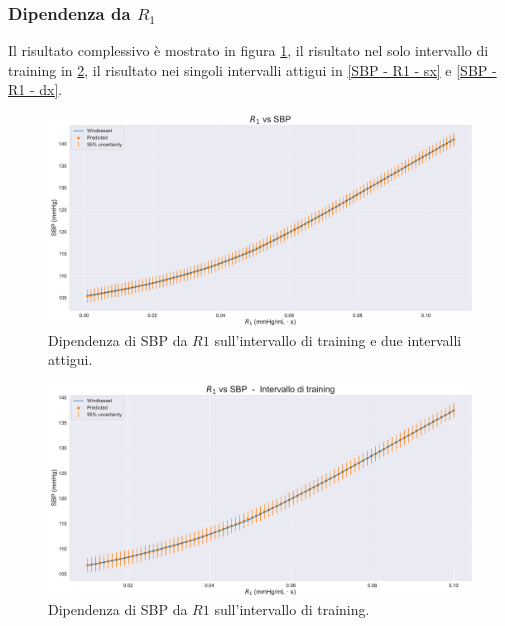 \newpage

\subsubsection{Dipendenza da $R_1$}
Il risultato complessivo è mostrato in figura \ref{SBP - R1 - full}, il risultato nel solo intervallo di training in \ref{SBP - R1 - training}, il risultato nei singoli intervalli attigui in \ref{SBP - R1 - sx} e \ref{SBP - R1 - dx}.

\vspace{0.7cm}


\begin{figure}[!htb]
    \centering
    \includegraphics[width=1\textwidth]{images/Training (risultati)/SBP/SBP - R1 - full.pdf}
    \caption{Dipendenza di SBP da $R1$ sull'intervallo di training e due intervalli attigui.}
    \label{SBP - R1 - full}
\end{figure}

\vspace{0.32cm}

\begin{figure}[!htb]
    \centering
    \includegraphics[width=1\textwidth]{images/Training (risultati)/SBP/SBP - R1 - training.pdf}
    \caption{Dipendenza di SBP da $R1$ sull'intervallo di training.}
    \label{SBP - R1 - training}
\end{figure}

